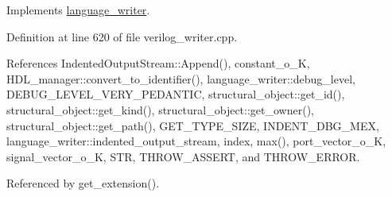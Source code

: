 Implements \hyperlink{classlanguage__writer_a97f0527b8b3b510dc254108379edf440}{language\+\_\+writer}.



Definition at line 620 of file verilog\+\_\+writer.\+cpp.



References Indented\+Output\+Stream\+::\+Append(), constant\+\_\+o\+\_\+K, H\+D\+L\+\_\+manager\+::convert\+\_\+to\+\_\+identifier(), language\+\_\+writer\+::debug\+\_\+level, D\+E\+B\+U\+G\+\_\+\+L\+E\+V\+E\+L\+\_\+\+V\+E\+R\+Y\+\_\+\+P\+E\+D\+A\+N\+T\+IC, structural\+\_\+object\+::get\+\_\+id(), structural\+\_\+object\+::get\+\_\+kind(), structural\+\_\+object\+::get\+\_\+owner(), structural\+\_\+object\+::get\+\_\+path(), G\+E\+T\+\_\+\+T\+Y\+P\+E\+\_\+\+S\+I\+ZE, I\+N\+D\+E\+N\+T\+\_\+\+D\+B\+G\+\_\+\+M\+EX, language\+\_\+writer\+::indented\+\_\+output\+\_\+stream, index, max(), port\+\_\+vector\+\_\+o\+\_\+K, signal\+\_\+vector\+\_\+o\+\_\+K, S\+TR, T\+H\+R\+O\+W\+\_\+\+A\+S\+S\+E\+RT, and T\+H\+R\+O\+W\+\_\+\+E\+R\+R\+OR.



Referenced by get\+\_\+extension().

